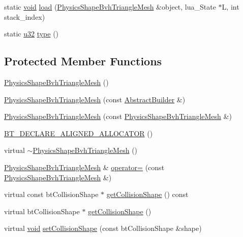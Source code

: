 \begin{DoxyCompactItemize}
\item 
static \mbox{\hyperlink{_thread_8h_af1e856da2e658414cb2456cb6f7ebc66}{void}} \mbox{\hyperlink{classnjli_1_1_physics_shape_bvh_triangle_mesh_a144673bc8d83ca747964024154e8b525}{load}} (\mbox{\hyperlink{classnjli_1_1_physics_shape_bvh_triangle_mesh}{Physics\+Shape\+Bvh\+Triangle\+Mesh}} \&object, lua\+\_\+\+State $\ast$L, int stack\+\_\+index)
\item 
static \mbox{\hyperlink{_util_8h_a10e94b422ef0c20dcdec20d31a1f5049}{u32}} \mbox{\hyperlink{classnjli_1_1_physics_shape_bvh_triangle_mesh_ae410fd0fc8a6a19c3efa29a1d87f833d}{type}} ()
\end{DoxyCompactItemize}
\subsection*{Protected Member Functions}
\begin{DoxyCompactItemize}
\item 
\mbox{\hyperlink{classnjli_1_1_physics_shape_bvh_triangle_mesh_ad8459c8e754640e092b27ebf0af6d380}{Physics\+Shape\+Bvh\+Triangle\+Mesh}} ()
\item 
\mbox{\hyperlink{classnjli_1_1_physics_shape_bvh_triangle_mesh_a83dc8a1b69e35a4fae6861b8de200fd0}{Physics\+Shape\+Bvh\+Triangle\+Mesh}} (const \mbox{\hyperlink{classnjli_1_1_abstract_builder}{Abstract\+Builder}} \&)
\item 
\mbox{\hyperlink{classnjli_1_1_physics_shape_bvh_triangle_mesh_ac6e8748f394f19877a8c3344cf6c5b7f}{Physics\+Shape\+Bvh\+Triangle\+Mesh}} (const \mbox{\hyperlink{classnjli_1_1_physics_shape_bvh_triangle_mesh}{Physics\+Shape\+Bvh\+Triangle\+Mesh}} \&)
\item 
\mbox{\hyperlink{classnjli_1_1_physics_shape_bvh_triangle_mesh_a364ae47a05022af3495fb4dc2432f275}{B\+T\+\_\+\+D\+E\+C\+L\+A\+R\+E\+\_\+\+A\+L\+I\+G\+N\+E\+D\+\_\+\+A\+L\+L\+O\+C\+A\+T\+OR}} ()
\item 
virtual \mbox{\hyperlink{classnjli_1_1_physics_shape_bvh_triangle_mesh_af2aab21ebea60c50045d380f9aa33a7e}{$\sim$\+Physics\+Shape\+Bvh\+Triangle\+Mesh}} ()
\item 
\mbox{\hyperlink{classnjli_1_1_physics_shape_bvh_triangle_mesh}{Physics\+Shape\+Bvh\+Triangle\+Mesh}} \& \mbox{\hyperlink{classnjli_1_1_physics_shape_bvh_triangle_mesh_a13628bf9856c76e8f4cb10d867b80268}{operator=}} (const \mbox{\hyperlink{classnjli_1_1_physics_shape_bvh_triangle_mesh}{Physics\+Shape\+Bvh\+Triangle\+Mesh}} \&)
\item 
virtual const bt\+Collision\+Shape $\ast$ \mbox{\hyperlink{classnjli_1_1_physics_shape_bvh_triangle_mesh_a8e2e34bd218b74d7f03c0bdcdf142901}{get\+Collision\+Shape}} () const
\item 
virtual bt\+Collision\+Shape $\ast$ \mbox{\hyperlink{classnjli_1_1_physics_shape_bvh_triangle_mesh_ac4db6814bd13306aee765a71203525a4}{get\+Collision\+Shape}} ()
\item 
virtual \mbox{\hyperlink{_thread_8h_af1e856da2e658414cb2456cb6f7ebc66}{void}} \mbox{\hyperlink{classnjli_1_1_physics_shape_bvh_triangle_mesh_a5aaf42224afb0773a280daddfa3c93d1}{set\+Collision\+Shape}} (const bt\+Collision\+Shape \&shape)
\end{DoxyCompactItemize}
